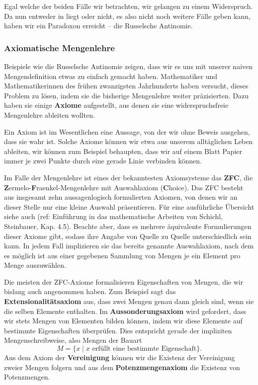\documentclass[../../main.tex]{subfiles}
\begin{document}
Egal welche der beiden Fälle wir betrachten, wir gelangen zu einem Widerspruch. Da \calR nun entweder in \calR liegt oder nicht, es also nicht noch weitere Fälle geben kann, haben wir ein Paradoxon erreicht -- die Russelsche Antinomie. 

\subsubsection{Axiomatische Mengenlehre}
Beispiele wie die Russelsche Antinomie zeigen, dass wir es uns mit unserer naiven Mengendefinition etwas zu einfach gemacht haben. Mathematiker und Mathematikerinnen des frühen zwanzigsten Jahrhunderts haben versucht, dieses Problem zu lösen, indem sie die bisherige Mengenlehre weiter präzisierten. Dazu haben sie einige \textbf{Axiome} aufgestellt, aus denen sie eine widerspruchsfreie Mengenlehre ableiten wollten.

Ein Axiom ist im Wesentlichen eine Aussage, von der wir ohne Beweis ausgehen, dass sie wahr ist. Solche Axiome können wir etwa aus unserem alltäglichen Leben ableiten, wir können zum Beispiel behaupten, dass wir auf einem Blatt Papier immer je zwei Punkte durch eine gerade Linie verbinden können.

Im Falle der Mengenlehre ist eines der bekanntesten Axiomsysteme das \textbf{ZFC}, die \textbf{Z}ermelo-\textbf{F}raenkel-Mengenlehre mit Auswahlaxiom (\textbf{C}hoice). Das ZFC besteht aus insgesamt zehn aussagenlogisch formulierten Axiomen, von denen wir an dieser Stelle nur eine kleine Auswahl präsentieren. Für eine ausführliche Übersicht siehe auch (ref: Einführung in das mathematische Arbeiten von Schichl, Steinbauer, Kap. 4.5). Beachte aber, dass es mehrere äquivalente Formulierungen dieser Axiome gibt, sodass ihre Angabe von Quelle zu Quelle unterschiedlich sein kann. In jedem Fall implizieren sie das bereits genannte Auswahlaxiom, nach dem es möglich ist aus einer gegebenen Sammlung von Mengen je ein Element pro Menge auszuwählen.

Die meisten der ZFC-Axiome formalisieren Eigenschaften von Mengen, die wir bislang auch angenommen haben. Zum Beispiel sagt das \textbf{Extensionalitätsaxiom} aus, dass zwei Mengen genau dann gleich sind, wenn sie die selben Elemente enthalten. Im \textbf{Aussonderungsaxiom} wird gefordert, dass wir stets Mengen von Elementen bilden können, indem wir diese Elemente auf bestimmte Eigenschaften überprüfen. Dies entspricht gerade der impliziten Mengenschreibweise, also Mengen der Bauart
\[M = \{x \mid x \text{ erfüllt eine bestimmte Eigenschaft}\}.\]
Aus dem Axiom der \textbf{Vereinigung} können wir die Existenz der Vereinigung zweier Mengen folgern und aus dem \textbf{Potenzmengenaxiom} die Existenz von Potenzmengen. 
\end{document}
